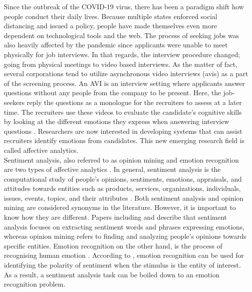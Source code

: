 Since the outbreak of the COVID-19 virus, there has been a paradigm shift how people conduct their daily lives. Because multiple states enforced social distancing and issued a  policy, people have made themselves even more dependent on technological tools and the web. The process of seeking jobs was also heavily affected by the pandemic since applicants were unable to meet physically for job interviews. In that regards, the interview procedure changed; going from physical meetings to video based interviews. As the matter of fact, several corporations tend to utilize asynchronous video interviews (\acrshort{avi}s) as a part of the screening process. An AVI is an interview setting where applicants answer questions without any people from the company to be present. Here, the job-seekers reply the questions as a monologue for the recruiters to assess at a later time. The recruiters use these videos to evaluate the candidate's cognitive skills by looking at the different emotions they express when answering interview questions \cite{JOSHI20201316}. Researchers are now interested in developing systems that can assist recruiters identify emotions from candidates. This new emerging research field is called affective analytics. \\

Sentiment analysis, also referred to as opinion mining and emotion recognition are two types of affective analytics \cite{MSA_review2_GANDHI2023424}. In general, sentiment analysis is the computational study of people’s opinions, sentiments, emotions, appraisals, and attitudes towards entities such as products, services, organizations, individuals, issues, events, topics, and their attributes \cite{SA-definition} \cite{HP-integration-project}. Both sentiment analysis and opinion mining are considered synonyms in the literature. However, it is important to know how they are different. Papers including \cite{SA-history-MANTYLA201816} and \cite{Student-feedback-MOOCS-app11093986} describe that sentiment analysis focuses on extracting sentiment words and phrases expressing emotions, whereas opinion mining refers to finding and analyzing people's opinions towards specific entities. Emotion recognition on the other hand, is the process of recognising human emotion \cite{MSA_review2_GANDHI2023424}. According to \cite{sentiment_emotion_difference_munezero2014they}, emotion recognition can be used for identifying the polarity of sentiment when the stimulus is the entity of interest. As a result, a sentiment analysis task can be boiled down to an emotion recognition problem.\\ 

